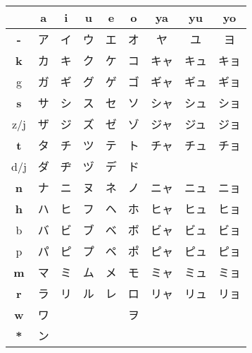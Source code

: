 

\begin{center}
\begin{tabular}{c||c|c|c|c|c||c|c|c|}
&
\textbf{\large a}&\textbf{\large i}&\textbf{\large u}&\textbf{\large e}&\textbf{\large o}&
\textbf{\small ya}&\textbf{\small yu}&\textbf{\small yo}\\\hline\hline

\textbf{\large -}  &ア &イ &ウ &エ &オ &ヤ   &ユ   &ヨ   \\ \hline 
\textbf{\large k}  &カ &キ &ク &ケ &コ &キャ &キュ &キョ \\
{\small g}         &ガ &ギ &グ &ゲ &ゴ &ギャ &ギュ &ギョ \\ \hline 
\textbf{\large s}  &サ &シ &ス &セ &ソ &シャ &シュ &ショ \\
{\small z/j}       &ザ &ジ &ズ &ゼ &ゾ &ジャ &ジュ &ジョ \\ \hline 
\textbf{\large t}  &タ &チ &ツ &テ &ト &チャ &チュ &チョ \\
{\small d/j}       &ダ &ヂ &ヅ &デ &ド &     &     &     \\ \hline 
\textbf{\large n}  &ナ &ニ &ヌ &ネ &ノ &ニャ &ニュ &ニョ \\ \hline 
\textbf{\large h}  &ハ &ヒ &フ &ヘ &ホ &ヒャ &ヒュ &ヒョ \\
{\small b}         &バ &ビ &ブ &ベ &ボ &ビャ &ビュ &ビョ \\
{\small p}         &パ &ピ &プ &ペ &ポ &ピャ &ピュ &ピョ \\ \hline 
\textbf{\large m}  &マ &ミ &ム &メ &モ &ミャ &ミュ &ミョ \\ \hline 
\textbf{\large r}  &ラ &リ &ル &レ &ロ &リャ &リュ &リョ \\ \hline 
\textbf{\large w}  &ワ &   &   &   &ヲ &     &     &     \\ \hline 
\textbf{\large {*}}&ン &   &   &   &   &     &     &     \\ \hline 

\end{tabular}
\end{center}
